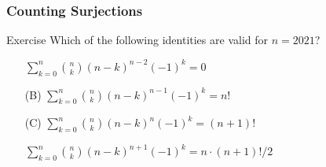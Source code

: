 \documentclass{beamer}
\begin{document}
\begin{frame}
    \frametitle{Counting Surjections}
    \vs{0.5em}
    \begin{block}{Exercise}
    \hh   Which of the following identities are valid for $n=2021$?
        \begin{itemize}
            \item[\green{(A)}]$\sum_{k=0}^n \binom{n}{k} (n-k)^{n-2} (-1)^k = 0$
            \item[(B)]$\sum_{k=0}^n \binom{n}{k} (n-k)^{n-1} (-1)^k = n!$
            \item[(C)]$\sum_{k=0}^n \binom{n}{k} (n-k)^{n}   (-1)^k = (n+1)!$
            \item[\green{(D)}]$\sum_{k=0}^n \binom{n}{k} (n-k)^{n+1} (-1)^k = n\cdot (n+1)! / 2$
        \end{itemize}
    \end{block}
\end{frame}
\end{document}
